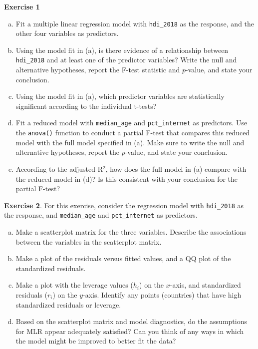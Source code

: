 \documentclass[11pt]{article}\usepackage[]{graphicx}\usepackage[]{color}
\begin{document}
\textbf{Exercise 1}
\begin{enumerate}[(a)]
\item Fit a multiple linear regression model with \texttt{hdi\_2018} as the response, and  the other four variables as predictors. 
\item Using the model fit in (a), is there evidence of a relationship between \texttt{hdi\_2018} and at least one of the predictor variables?  Write the null and alternative hypotheses, report the F-test statistic and $p$-value, and state your conclusion.
\item Using the model fit in (a), which predictor variables are statistically significant according to the individual t-tests?\\
\item Fit a reduced model with \texttt{median\_age} and \texttt{pct\_internet} as predictors.  Use the \texttt{anova()} function to conduct a partial F-test that compares this reduced model with the full model specified in (a).  Make sure to write the null and alternative hypotheses, report the $p$-value, and state your conclusion.
\item According to the adjusted-R$^2$, how does the full model in (a) compare with the reduced model in (d)?  Is this consistent with your conclusion for the partial F-test?\\
\end{enumerate}

\textbf{Exercise 2}.  For this exercise, consider the regression model with \texttt{hdi\_2018} as the response, and \texttt{median\_age} and \texttt{pct\_internet} as predictors.  
\begin{enumerate}[(a)]
\item Make a scatterplot matrix for the three variables.  Describe the associations between the variables in the scatterplot matrix.
\item Make a plot of the residuals versus fitted values, and a QQ plot of the standardized residuals. 
\item Make a plot with the leverage values ($h_i$) on the $x$-axis, and standardized residuals ($r_i$) on the $y$-axis.  Identify any points (countries) that have high standardized residuals or leverage.
\item Based on the  scatterplot matrix and model diagnostics, do the assumptions for MLR appear adequately satisfied?  Can you think of any ways in which the model might be improved to better fit the data?
\end{enumerate}
\end{document}
